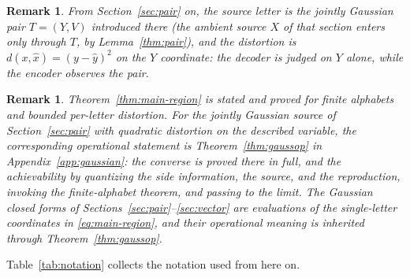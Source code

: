 \documentclass[11pt,onecolumn]{IEEEtran}
\newtheorem{remark}[theorem]{Remark}
\begin{document}
\begin{remark}\label{rem:specialization}
From Section~\ref{sec:pair} on, the source letter is the jointly Gaussian
pair $T=(Y,V)$ introduced there (the ambient source $X$ of that section
enters only through $T$, by Lemma~\ref{thm:pair}), and the distortion is
$d(x,\hat x)=(y-\hat y)^2$ on the $Y$ coordinate: the decoder is judged on
$Y$ alone, while the encoder observes the pair.
\end{remark}

\begin{remark}\label{rem:scope}
Theorem~\ref{thm:main-region} is stated and proved for finite alphabets and
bounded per-letter distortion. For the jointly Gaussian source of
Section~\ref{sec:pair} with quadratic distortion on the described
variable, the corresponding operational statement is
Theorem~\ref{thm:gaussop} in Appendix~\ref{app:gaussian}: the converse
is proved there in full, and the achievability by quantizing the side information, the source, and the
reproduction, invoking the finite-alphabet theorem, and passing to the
limit. The Gaussian closed forms of
Sections~\ref{sec:pair}--\ref{sec:vector} are evaluations of the
single-letter coordinates in \eqref{eq:main-region}, and their
operational meaning is inherited through Theorem~\ref{thm:gaussop}.
\end{remark}

Table~\ref{tab:notation} collects the notation used from here on.
\end{document}
